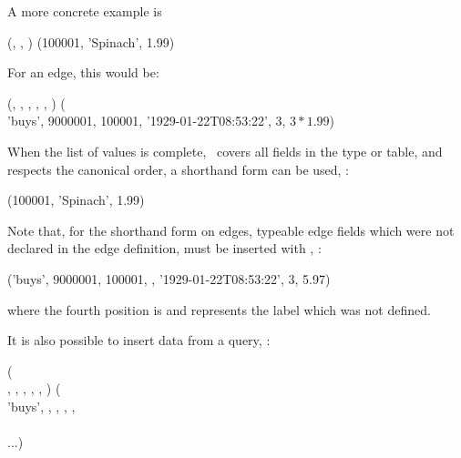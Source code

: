 A more concrete example is

  
                      (,
                       ,
                       )
                      (100001, 'Spinach', 1.99)

For an edge, this would be:

\begin{minipage}{\textwidth}
  
                      (,
                       ,
                       ,
                       ,
                       ,
                       )
                      (\\
\hspace*{2.99cm}       'buys', 9000001, 100001,
                       '1929-01-22T08:53:22',
                       3, $3\ast 1.99$)
\end{minipage}

When the list of values is complete,
\ie\ covers all fields in the type or table,
and respects the canonical order,
a shorthand form can be used, \eg:

  
                      (100001, 'Spinach', 1.99)

Note that, for the shorthand form on edges,
typeable edge fields which were not declared
in the edge definition, must be inserted with
, \eg:

\begin{minipage}{\textwidth}
  
                      ('buys', 9000001, 100001,
                       ,
                       '1929-01-22T08:53:22',
                       3, 5.97)
\end{minipage}

where the fourth position is  and represents
the label which was not defined.

It is also possible  to insert data from
a query, \eg:

\begin{minipage}{\textwidth}
  ( \\
                      ,
                      ,
                      ,
                      ,
                      ,
                      ) (\\
\hspace*{0.2cm} 'buys', , 
                         ,
                         ,
                         ,
                          \\
\hspace*{0.35cm}  \\
\hspace*{0.2cm} $\dots$)
\end{minipage}

